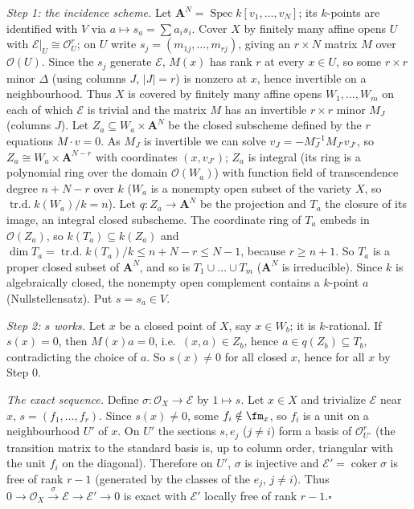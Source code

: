 \documentclass[11pt]{article}
\begin{document}
\emph{Step 1: the incidence scheme.} Let $\mathbf A^N=\operatorname{Spec}k[v_1,\dots,v_N]$; its $k$-points are identified with $V$ via $a\mapsto s_a=\sum a_is_i$. Cover $X$ by finitely many affine opens $U$ with $\mathcal E|_U\cong\mathcal O_U^r$; on $U$ write $s_j=(m_{1j},\dots,m_{rj})$, giving an $r\times N$ matrix $M$ over $\mathcal O(U)$. Since the $s_j$ generate $\mathcal E$, $M(x)$ has rank $r$ at every $x\in U$, so some $r\times r$ minor $\Delta$ (using columns $J$, $|J|=r$) is nonzero at $x$, hence invertible on a neighbourhood. Thus $X$ is covered by finitely many affine opens $W_1,\dots,W_m$ on each of which $\mathcal E$ is trivial and the matrix $M$ has an invertible $r\times r$ minor $M_J$ (columns $J$). Let $Z_a\subseteq W_a\times\mathbf A^N$ be the closed subscheme defined by the $r$ equations $M\cdot v=0$. As $M_J$ is invertible we can solve $v_J=-M_J^{-1}M_{J'}v_{J'}$, so $Z_a\cong W_a\times\mathbf A^{N-r}$ with coordinates $(x,v_{J'})$; $Z_a$ is integral (its ring is a polynomial ring over the domain $\mathcal O(W_a)$) with function field of transcendence degree $n+N-r$ over $k$ ($W_a$ is a nonempty open subset of the variety $X$, so $\operatorname{tr.d.}k(W_a)/k=n$). Let $q:Z_a\to\mathbf A^N$ be the projection and $T_a$ the closure of its image, an integral closed subscheme. The coordinate ring of $T_a$ embeds in $\mathcal O(Z_a)$, so $k(T_a)\subseteq k(Z_a)$ and $\dim T_a=\operatorname{tr.d.}k(T_a)/k\le n+N-r\le N-1$, because $r\ge n+1$. So $T_a$ is a proper closed subset of $\mathbf A^N$, and so is $T_1\cup\dots\cup T_m$ ($\mathbf A^N$ is irreducible). Since $k$ is algebraically closed, the nonempty open complement contains a $k$-point $a$ (Nullstellensatz). Put $s=s_a\in V$.

\emph{Step 2: $s$ works.} Let $x$ be a closed point of $X$, say $x\in W_b$; it is $k$-rational. If $s(x)=0$, then $M(x)a=0$, i.e.\ $(x,a)\in Z_b$, hence $a\in q(Z_b)\subseteq T_b$, contradicting the choice of $a$. So $s(x)\ne0$ for all closed $x$, hence for all $x$ by Step 0.

\emph{The exact sequence.} Define $\sigma:\mathcal O_X\to\mathcal E$ by $1\mapsto s$. Let $x\in X$ and trivialize $\mathcal E$ near $x$, $s=(f_1,\dots,f_r)$. Since $s(x)\ne0$, some $f_i\notin\fm_x$, so $f_i$ is a unit on a neighbourhood $U'$ of $x$. On $U'$ the sections $s,e_j$ ($j\ne i$) form a basis of $\mathcal O_{U'}^r$ (the transition matrix to the standard basis is, up to column order, triangular with the unit $f_i$ on the diagonal). Therefore on $U'$, $\sigma$ is injective and $\mathcal E'=\operatorname{coker}\sigma$ is free of rank $r-1$ (generated by the classes of the $e_j$, $j\ne i$). Thus $0\to\mathcal O_X\xrightarrow{\sigma}\mathcal E\to\mathcal E'\to0$ is exact with $\mathcal E'$ locally free of rank $r-1$.\hfill$\square$
\end{document}

